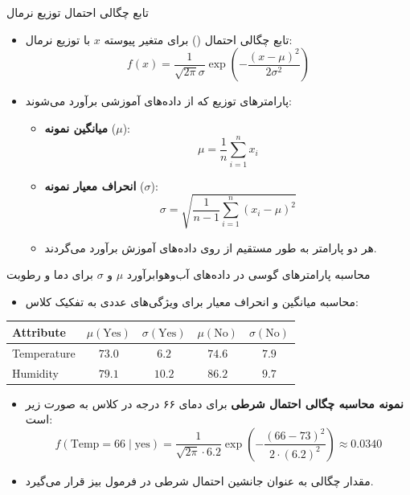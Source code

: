 \begin{frame}{تابع چگالی احتمال توزیع نرمال}{}
  \begin{itemize}
    \setlength{\itemsep}{6pt}
    \item تابع چگالی احتمال () برای متغیر پیوسته $x$ با توزیع نرمال:
    \[
      f(x) = \frac{1}{\sqrt{2\pi}\sigma} \exp\left(-\frac{(x - \mu)^2}{2\sigma^2}\right)
    \]
    \item پارامترهای توزیع که از داده‌های آموزشی برآورد می‌شوند:
    \begin{itemize}
      \item \textbf{میانگین نمونه} ($\mu$):
      \[
        \mu = \frac{1}{n} \sum_{i=1}^{n} x_i
      \]
      \item \textbf{انحراف معیار نمونه} ($\sigma$):
      \[
        \sigma = \sqrt{\frac{1}{n-1}\sum_{i=1}^{n} (x_i - \mu)^2}
      \]
      \item هر دو پارامتر به طور مستقیم از روی داده‌های آموزش برآورد می‌گردند.
    \end{itemize}
  \end{itemize}
\end{frame}

\begin{frame}{محاسبه پارامترهای گوسی در داده‌های آب‌وهوا}{برآورد $\mu$ و $\sigma$ برای دما و رطوبت}
  \begin{itemize}
    \item محاسبه میانگین و انحراف معیار برای ویژگی‌های عددی به تفکیک کلاس:
  \end{itemize}
  \begin{center}
    \small
    \begin{latin}
    \begin{tabular}{|l|cc|cc|}
      \hline
      \textbf{Attribute} & $\mu (\text{Yes})$ & $\sigma (\text{Yes})$ & $\mu (\text{No})$ & $\sigma (\text{No})$ \\
      \hline
      Temperature & $73.0$ & $6.2$ & $74.6$ & $7.9$ \\
      Humidity & $79.1$ & $10.2$ & $86.2$ & $9.7$ \\
      \hline
    \end{tabular}
    \end{latin}
  \end{center}
  \vspace{0.2cm}
  \begin{itemize}
    \item \textbf{نمونه محاسبه چگالی احتمال شرطی} برای دمای ۶۶ درجه در کلاس  به صورت زیر است:
    \[
      f(\text{Temp}=66 \mid \text{yes}) = \frac{1}{\sqrt{2\pi} \cdot 6.2} \exp\left(-\frac{(66 - 73)^2}{2 \cdot (6.2)^2}\right) \approx 0.0340
    \]
    \item مقدار چگالی به عنوان جانشین احتمال شرطی در فرمول بیز قرار می‌گیرد.
  \end{itemize}
\end{frame}

